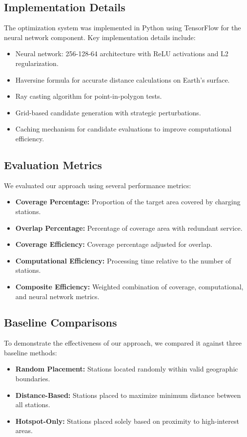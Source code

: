 \documentclass[journal]{IEEEtran}
\begin{document}
\subsection{Implementation Details}
The optimization system was implemented in Python using TensorFlow for the neural network component. Key implementation details include:
\begin{itemize}
    \item Neural network: 256-128-64 architecture with ReLU activations and L2 regularization.
    \item Haversine formula for accurate distance calculations on Earth's surface.
    \item Ray casting algorithm for point-in-polygon tests.
    \item Grid-based candidate generation with strategic perturbations.
    \item Caching mechanism for candidate evaluations to improve computational efficiency.
\end{itemize}

\subsection{Evaluation Metrics}
We evaluated our approach using several performance metrics:
\begin{itemize}
    \item \textbf{Coverage Percentage:} Proportion of the target area covered by charging stations.
    \item \textbf{Overlap Percentage:} Percentage of coverage area with redundant service.
    \item \textbf{Coverage Efficiency:} Coverage percentage adjusted for overlap.
    \item \textbf{Computational Efficiency:} Processing time relative to the number of stations.
    \item \textbf{Composite Efficiency:} Weighted combination of coverage, computational, and neural network metrics.
\end{itemize}

\subsection{Baseline Comparisons}
To demonstrate the effectiveness of our approach, we compared it against three baseline methods:
\begin{itemize}
    \item \textbf{Random Placement:} Stations located randomly within valid geographic boundaries.
    \item \textbf{Distance-Based:} Stations placed to maximize minimum distance between all stations.
    \item \textbf{Hotspot-Only:} Stations placed solely based on proximity to high-interest areas.
\end{itemize}
\end{document}
